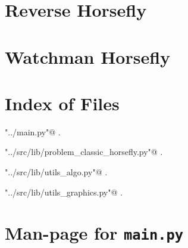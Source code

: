 \documentclass[11.5pt]{report}
\begin{document}
\chapter{Reverse Horsefly}
\label{chap:reverse-horsefly}\chapter{Watchman Horsefly}
\label{watchman-horsefly}

\begin{appendices}
\chapter{Index of Files}

{\small\begin{list}{}{\setlength{\itemsep}{-\parsep}\setlength{\itemindent}{-\leftmargin}}
\item \verb@"../main.py"@ {\footnotesize {\NWtxtDefBy} .}
\item \verb@"../src/lib/problem_classic_horsefly.py"@ {\footnotesize {\NWtxtDefBy} .}
\item \verb@"../src/lib/utils_algo.py"@ {\footnotesize {\NWtxtDefBy} .
}
\item \verb@"../src/lib/utils_graphics.py"@ {\footnotesize {\NWtxtDefBy} .
}
\end{list}}
\chapter{Man-page for \texttt{main.py}}


\end{appendices}
\end{document}
